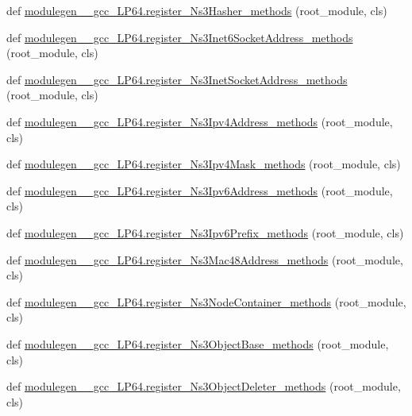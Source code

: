 \begin{DoxyCompactItemize}
\item 
def \hyperlink{namespacemodulegen____gcc__LP64_a6615c86326777b99b9d48f2543fa24fb}{modulegen\+\_\+\+\_\+gcc\+\_\+\+L\+P64.\+register\+\_\+\+Ns3\+Hasher\+\_\+methods} (root\+\_\+module, cls)
\item 
def \hyperlink{namespacemodulegen____gcc__LP64_a33ba058421864db1972ed4a87cb086fe}{modulegen\+\_\+\+\_\+gcc\+\_\+\+L\+P64.\+register\+\_\+\+Ns3\+Inet6\+Socket\+Address\+\_\+methods} (root\+\_\+module, cls)
\item 
def \hyperlink{namespacemodulegen____gcc__LP64_ac7474a92931aa2d401ee9815d47b594e}{modulegen\+\_\+\+\_\+gcc\+\_\+\+L\+P64.\+register\+\_\+\+Ns3\+Inet\+Socket\+Address\+\_\+methods} (root\+\_\+module, cls)
\item 
def \hyperlink{namespacemodulegen____gcc__LP64_a52c7eb3519820103a7ff4aaf269a6c89}{modulegen\+\_\+\+\_\+gcc\+\_\+\+L\+P64.\+register\+\_\+\+Ns3\+Ipv4\+Address\+\_\+methods} (root\+\_\+module, cls)
\item 
def \hyperlink{namespacemodulegen____gcc__LP64_abfab99a01a92901ea710a50ce313c67c}{modulegen\+\_\+\+\_\+gcc\+\_\+\+L\+P64.\+register\+\_\+\+Ns3\+Ipv4\+Mask\+\_\+methods} (root\+\_\+module, cls)
\item 
def \hyperlink{namespacemodulegen____gcc__LP64_adadace4a2a2a7b40dbbc479c719515d9}{modulegen\+\_\+\+\_\+gcc\+\_\+\+L\+P64.\+register\+\_\+\+Ns3\+Ipv6\+Address\+\_\+methods} (root\+\_\+module, cls)
\item 
def \hyperlink{namespacemodulegen____gcc__LP64_aabc084fc7c70fffda3389dc15cd95031}{modulegen\+\_\+\+\_\+gcc\+\_\+\+L\+P64.\+register\+\_\+\+Ns3\+Ipv6\+Prefix\+\_\+methods} (root\+\_\+module, cls)
\item 
def \hyperlink{namespacemodulegen____gcc__LP64_aa406a8e967bb0e5456a51fcef1ec276b}{modulegen\+\_\+\+\_\+gcc\+\_\+\+L\+P64.\+register\+\_\+\+Ns3\+Mac48\+Address\+\_\+methods} (root\+\_\+module, cls)
\item 
def \hyperlink{namespacemodulegen____gcc__LP64_afc1115291cc5820268d802870956928d}{modulegen\+\_\+\+\_\+gcc\+\_\+\+L\+P64.\+register\+\_\+\+Ns3\+Node\+Container\+\_\+methods} (root\+\_\+module, cls)
\item 
def \hyperlink{namespacemodulegen____gcc__LP64_a811b76d9911bfa2ed025b14b9a8aeb50}{modulegen\+\_\+\+\_\+gcc\+\_\+\+L\+P64.\+register\+\_\+\+Ns3\+Object\+Base\+\_\+methods} (root\+\_\+module, cls)
\item 
def \hyperlink{namespacemodulegen____gcc__LP64_ae02c1fc1dc3e8ca9071dee347b82eae5}{modulegen\+\_\+\+\_\+gcc\+\_\+\+L\+P64.\+register\+\_\+\+Ns3\+Object\+Deleter\+\_\+methods} (root\+\_\+module, cls)

\end{DoxyCompactItemize}
